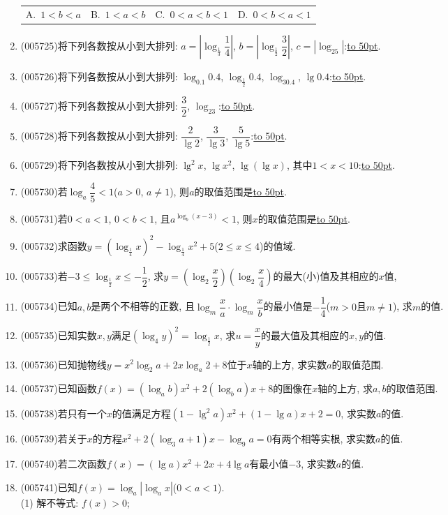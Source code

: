 \documentclass[10pt,a4paper]{article}
\newcommand{\blank}[1]{\underline{\hbox to #1pt{}}}
\newcommand{\fourch}[4]{\par\begin{tabular}{p{.23\textwidth}p{.23\textwidth}p{.23\textwidth}p{.23\textwidth}}
A.~#1 &B.~#2& C.~#3& D.~#4
\end{tabular}}
\begin{document}
\begin{enumerate}[1.]
\fourch{$1<b<a$}{$1<a<b$}{$0<a<b<1$}{$0<b<a<1$}
\item {\tiny (005725)}将下列各数按从小到大排列: $a=|\log_{\frac 13}\dfrac 14|$, $b=|\log_{\frac 12}\dfrac 32|$, $c=|\log_25|$:\blank{50}.
\item {\tiny (005726)}将下列各数按从小到大排列: $\log_{0.1}0.4$, $\log_{\frac 12}0.4$, $\log_30.4$, $\lg 0.4$:\blank{50}.
\item {\tiny (005727)}将下列各数按从小到大排列: $\dfrac 32$, $\log_23$:\blank{50}.
\item {\tiny (005728)}将下列各数按从小到大排列: $\dfrac 2{\lg 2}$, $\dfrac 3{\lg 3}$, $\dfrac 5{\lg 5}$:\blank{50}.
\item {\tiny (005729)}将下列各数按从小到大排列: $\lg ^2x$, $\lg x^2$, $\lg (\lg x)$, 其中$1<x<10$:\blank{50}.
\item {\tiny (005730)}若$\log_a\dfrac 45<1$($a>0$, $a\ne 1$), 则$a$的取值范围是\blank{50}.
\item {\tiny (005731)}若$0<a<1$, $0<b<1$, 且$a^{\log_b(x-3)}<1$, 则$x$的取值范围是\blank{50}.
\item {\tiny (005732)}求函数$y=(\log_{\frac 14}x)^2-\log_{\frac 14}x^2+5$($2\le x\le 4$)的值域.
\item {\tiny (005733)}若$-3\le \log_{\frac 12}x\le -\dfrac 12$, 求$y=(\log_2\dfrac x2)(\log_2\dfrac x4)$的最大(小)值及其相应的$x$值,
\item {\tiny (005734)}已知$a,b$是两个不相等的正数, 且$\log_m\dfrac xa\cdot \log_m\dfrac xb$的最小值是$-\dfrac 14$($m>0$且$m\ne 1$), 求$m$的值.
\item {\tiny (005735)}已知实数$x,y$满足$(\log_4y)^2=\log_{\frac 12}x$, 求$u=\dfrac xy$的最大值及其相应的$x,y$的值.
\item {\tiny (005736)}已知抛物线$y=x^2\log_2a+2x\log_a2+8$位于$x$轴的上方, 求实数$a$的取值范围.
\item {\tiny (005737)}已知函数$f(x)=(\log_ab)x^2+2(\log_ba)x+8$的图像在$x$轴的上方, 求$a,b$的取值范围.
\item {\tiny (005738)}若只有一个$x$的值满足方程$(1-\lg ^2a)x^2+(1-\lg a)x+2=0$, 求实数$a$的值.
\item {\tiny (005739)}若关于$x$的方程$x^2+2(\log_3a+1)x-\log_9a=0$有两个相等实根, 求实数$a$的值.
\item {\tiny (005740)}若二次函数$f(x)=(\lg a)x^2+2x+4\lg a$有最小值$-3$, 求实数$a$的值.
\item {\tiny (005741)}已知$f(x)=\log_a|\log_ax|$($0<a<1$).\\
(1) 解不等式: $f(x)>0$;\\

\end{enumerate}
\end{document}
